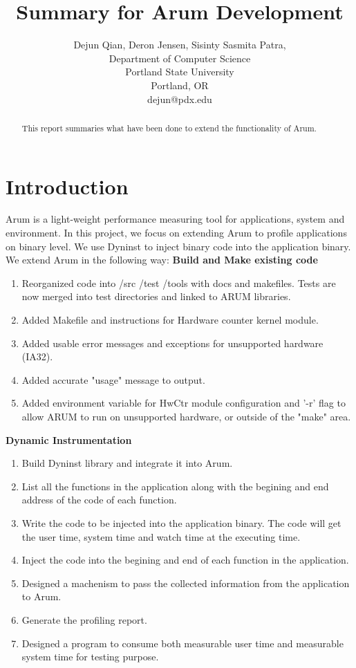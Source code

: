 \documentclass[11pt,letterpaper,oneside]{article}
\title{Summary for Arum Development}
\author{Dejun Qian, Deron Jensen, Sisinty Sasmita Patra,  \\Department of Computer Science\\Portland State University\\Portland, OR\\dejun@pdx.edu}
\begin{document}
\maketitle

\begin{abstract}
This report summaries what have been done to extend the functionality of Arum.
\end{abstract}

\section{Introduction}
Arum is a light-weight performance measuring tool for applications, system and environment. In this project, we focus on extending Arum to profile applications on binary level. We use Dyninst to inject binary code into the application binary. We extend Arum in the following way:
\newline
\textbf{Build and Make existing code}
\begin{enumerate}
\item Reorganized code into /src /test /tools with docs and makefiles.  Tests are now merged into test directories and linked to ARUM libraries.
\item Added Makefile and instructions for Hardware counter kernel module.
\item Added usable error messages and exceptions for unsupported hardware (IA32).
\item Added accurate "usage" message to output.
\item Added environment variable for HwCtr module configuration and '-r' flag to allow ARUM to run on unsupported hardware, or outside of the "make" area.
\end{enumerate}
\textbf{Dynamic Instrumentation}
\begin{enumerate}
\item Build Dyninst library and integrate it into Arum.
\item List all the functions in the application along with the begining and end address of the code of each function.
\item Write the code to be injected into the application binary. The code will get the user time, system time and watch time at the executing time.
\item Inject the code into the begining and end of each function in the application.
\item Designed a machenism to pass the collected information from the application to Arum.
\item Generate the profiling report.
\item Designed a program to consume both measurable user time and measurable system time for testing purpose.
\end{enumerate}
\end{document}
